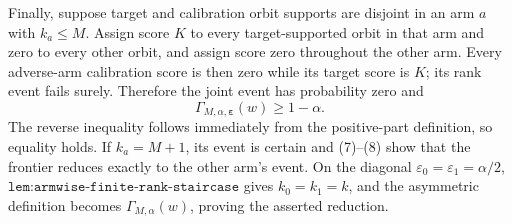Finally, suppose target and calibration orbit supports are disjoint in an arm \(a\) with \(k_a\le M\). Assign score \(K\) to every target-supported orbit in that arm and zero to every other orbit, and assign score zero throughout the other arm. Every adverse-arm calibration score is then zero while its target score is \(K\); its rank event fails surely. Therefore the joint event has probability zero and
\[
\Gamma_{M,\alpha,\boldsymbol\varepsilon}(w)\ge1-\alpha.
\]
The reverse inequality follows immediately from the positive-part definition, so equality holds. If \(k_a=M+1\), its event is certain and (7)--(8) show that the frontier reduces exactly to the other arm's event. On the diagonal \(\varepsilon_0=\varepsilon_1=\alpha/2\), \(\texttt{lem:armwise-finite-rank-staircase}\) gives \(k_0=k_1=k\), and the asymmetric definition becomes \(\Gamma_{M,\alpha}(w)\), proving the asserted reduction.